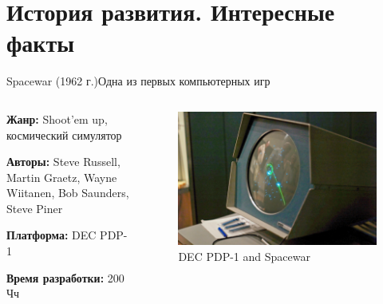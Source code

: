 \documentclass{beamer}
\begin{document}
	\section{История развития. Интересные факты}
	
	\begin{frame}{Spacewar (1962 г.)}{Одна из первых компьютерных игр}
	
	\begin{columns}
		
		\begin{column}{0.5\textwidth}
			
			
			\textbf{Жанр:} Shoot’em up, космический симулятор
			
			\textbf{Авторы:} Steve Russell, Martin Graetz, Wayne Wiitanen, Bob Saunders, Steve Piner
			
			\textbf{Платформа:} DEC PDP-1
			
			\textbf{Время разработки:} 200 Чч
			
		\end{column}
		\begin{column}{0.5\textwidth}
			\begin{figure} 
			\includegraphics[width=\textwidth]{images/Spacewar.png}
			\caption {DEC PDP-1 and Spacewar}
			\end{figure}
		\end{column}
		
	\end{columns}
	
\end{frame}
\end{document}
